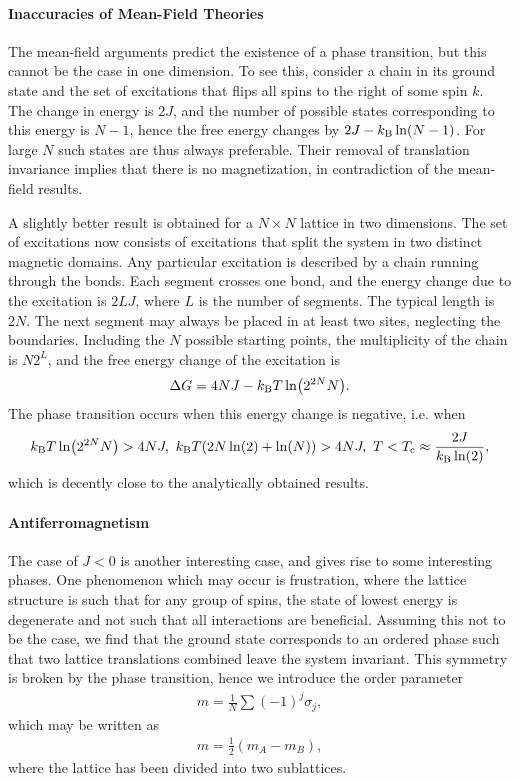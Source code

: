 \paragraph{Inaccuracies of Mean-Field Theories}
The mean-field arguments predict the existence of a phase transition, but this cannot be the case in one dimension. To see this, consider a chain in its ground state and the set of excitations that flips all spins to the right of some spin $k$. The change in energy is $2J$, and the number of possible states corresponding to this energy is $N - 1$, hence the free energy changes by $2J - k_{\text{B}}\ln(N - 1)$. For large $N$ such states are thus always preferable. Their removal of translation invariance implies that there is no magnetization, in contradiction of the mean-field results.

A slightly better result is obtained for a $N\times N$ lattice in two dimensions. The set of excitations now consists of excitations that split the system in two distinct magnetic domains. Any particular excitation is described by a chain running through the bonds. Each segment crosses one bond, and the energy change due to the excitation is $2LJ$, where $L$ is the number of segments. The typical length is $2N$. The next segment may always be placed in at least two sites, neglecting the boundaries. Including the $N$ possible starting points, the multiplicity of the chain is $N2^{L}$, and the free energy change of the excitation is
\begin{align*}
	\Delta G = 4NJ - k_{\text{B}} T\ln(2^{2N}N).
\end{align*}
The phase transition occurs when this energy change is negative, i.e. when
\begin{align*}
	k_{\text{B}} T\ln(2^{2N}N) > 4NJ,\ k_{\text{B}} T(2N\ln(2) + \ln(N)) > 4NJ,\ T < T_{\text{c}} \approx \frac{2J}{k_{\text{B}}\ln(2)},
\end{align*}
which is decently close to the analytically obtained results.

\paragraph{Antiferromagnetism}
The case of $J < 0$ is another interesting case, and gives rise to some interesting phases. One phenomenon which may occur is frustration, where the lattice structure is such that for any group of spins, the state of lowest energy is degenerate and not such that all interactions are beneficial. Assuming this not to be the case, we find that the ground state corresponds to an ordered phase such that two lattice translations combined leave the system invariant. This symmetry is broken by the phase transition, hence we introduce the order parameter
\begin{align*}
	m = \frac{1}{N}\sum(-1)^{j}\sigma_{j},
\end{align*}
which may be written as
\begin{align*}
	m = \frac{1}{2}(m_{A} - m_{B}),
\end{align*}
where the lattice has been divided into two sublattices.

